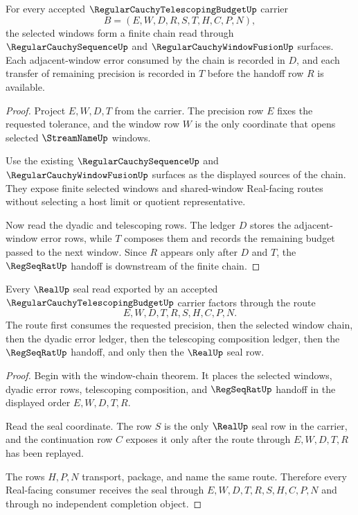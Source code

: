 \begin{theorem}
\label{thm:regular-cauchy-telescoping-budget-window-chain}
For every accepted $\RegularCauchyTelescopingBudgetUp$ carrier
$$
B=(E,W,D,R,S,T,H,C,P,N),
$$
the selected windows form a finite chain read through $\RegularCauchySequenceUp$ and $\RegularCauchyWindowFusionUp$ surfaces. Each adjacent-window error consumed by the chain is recorded in $D$, and each transfer of remaining precision is recorded in $T$ before the handoff row $R$ is available.
\end{theorem}
\begin{proof}
Project $E,W,D,T$ from the carrier. The precision row $E$ fixes the requested tolerance, and the window row $W$ is the only coordinate that opens selected $\StreamNameUp$ windows.

Use the existing $\RegularCauchySequenceUp$ and $\RegularCauchyWindowFusionUp$ surfaces as the displayed sources of the chain. They expose finite selected windows and shared-window Real-facing routes without selecting a host limit or quotient representative.

Now read the dyadic and telescoping rows. The ledger $D$ stores the adjacent-window error rows, while $T$ composes them and records the remaining budget passed to the next window. Since $R$ appears only after $D$ and $T$, the $\RegSeqRatUp$ handoff is downstream of the finite chain.
\end{proof}

\begin{theorem}
\label{thm:regular-cauchy-telescoping-budget-real-seal-handoff}
Every $\RealUp$ seal read exported by an accepted $\RegularCauchyTelescopingBudgetUp$ carrier factors through the route
$$
E,W,D,T,R,S,H,C,P,N.
$$
The route first consumes the requested precision, then the selected window chain, then the dyadic error ledger, then the telescoping composition ledger, then the $\RegSeqRatUp$ handoff, and only then the $\RealUp$ seal row.
\end{theorem}
\begin{proof}
Begin with the window-chain theorem. It places the selected windows, dyadic error rows, telescoping composition, and $\RegSeqRatUp$ handoff in the displayed order $E,W,D,T,R$.

Read the seal coordinate. The row $S$ is the only $\RealUp$ seal row in the carrier, and the continuation row $C$ exposes it only after the route through $E,W,D,T,R$ has been replayed.

The rows $H,P,N$ transport, package, and name the same route. Therefore every Real-facing consumer receives the seal through $E,W,D,T,R,S,H,C,P,N$ and through no independent completion object.
\end{proof}

